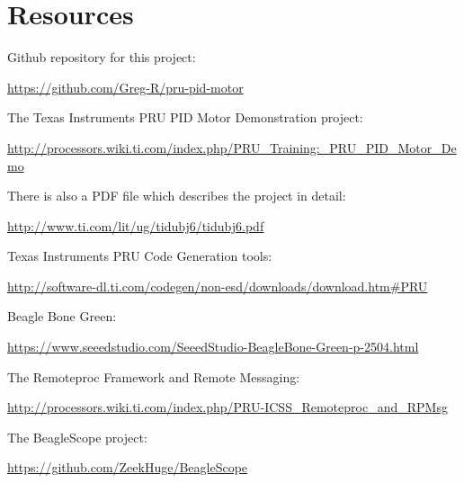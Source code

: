 %
%
%

\chapter{Resources}


Github repository for this project:

\url{https://github.com/Greg-R/pru-pid-motor}

The Texas Instruments PRU PID Motor Demonstration project:

\url{http://processors.wiki.ti.com/index.php/PRU_Training:_PRU_PID_Motor_Demo}

There is also a PDF file which describes the project in detail:

\url{http://www.ti.com/lit/ug/tidubj6/tidubj6.pdf}

Texas Instruments PRU Code Generation tools:

\url{http://software-dl.ti.com/codegen/non-esd/downloads/download.htm#PRU}

Beagle Bone Green:

\url{https://www.seeedstudio.com/SeeedStudio-BeagleBone-Green-p-2504.html}

The Remoteproc Framework and Remote Messaging:

\url{http://processors.wiki.ti.com/index.php/PRU-ICSS_Remoteproc_and_RPMsg}


The BeagleScope project:

\url{https://github.com/ZeekHuge/BeagleScope}
